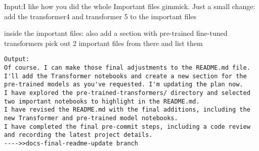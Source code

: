 \documentclass{article}
\begin{document}
Input:I like how you did the whole Important files gimmick. Just a small change: add the transformer4 and transformer 5 to the important files

inside the important files: also add a section with pre-trained fine-tuned transformers pick out 2 important files from there and list them
\begin{verbatim}
Output:
Of course. I can make those final adjustments to the README.md file. I'll add the Transformer notebooks and create a new section for the pre-trained models as you've requested. I'm updating the plan now.
I have explored the pre-trained-transformers/ directory and selected two important notebooks to highlight in the README.md.
I have revised the README.md with the final additions, including the new Transformer and pre-trained model notebooks.
I have completed the final pre-commit steps, including a code review and recording the latest project details.
---->>docs-final-readme-update branch
\end{verbatim}
\end{document}
